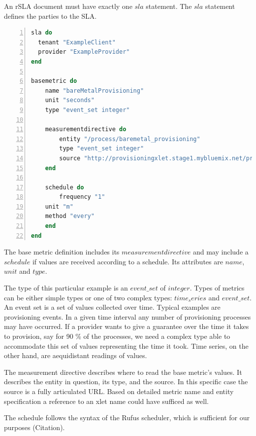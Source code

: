 An rSLA document must have exactly one $sla$ statement. The $sla$ statement defines the parties to the SLA. 



\begin{minipage}{1.0\textwidth}
\begin{lstlisting}[language=Ruby, basicstyle=\small\normalfont\sffamily, breaklines=true,  captionpos=b, mathescape=true, caption=rSLA SLA (lines 1-4) and basemetric (lines 6-19)  statements, label=basescript, numbers=left, numbersep=5pt, numberstyle=\tiny] 
sla do
  tenant "ExampleClient"
  provider "ExampleProvider"
end  

basemetric do
    name "bareMetalProvisioning"
    unit "seconds"
    type "event_set integer"

    measurementdirective do
    	entity "/process/baremetal_provisioning"
    	type "event_set integer"
    	source "http://provisioningxlet.stage1.mybluemix.net/process/baremetal_provisioning/time" 
    end

    schedule do
    	frequency "1"
   	unit "m"
   	method "every"
    end
end
\end{lstlisting}
\end{minipage} 

The base metric definition includes its $measurementdirective$ and may include a $schedule$ if values are received according to a schedule. Its attributes are $name$,  $unit$ and $type$. 

The type of this particular example is an $event\_set$ of $integer$. Types of metrics can be either simple types or one of two complex types: $time_series$ and $event\_set$. An event set is a set of values collected over time. Typical examples are provisioning events. In a given time interval any number of provisioning processes may have occurred. If a provider wants to give a guarantee over the time it takes to provision, say for 90 \% of the processes, we need a complex type able to accommodate this set of values representing the time it took. Time series, on the other hand, are aequidistant readings of values. 

The measurement directive describes where to read the base metric's values. It describes the entity in question, its type, and the source. In this specific case the source is a fully articulated URL. Based on detailed metric name and entity specification a reference to an xlet name could have sufficed as well.

The schedule follows the syntax of the Rufus scheduler, which is sufficient for our purposes (Citation).

